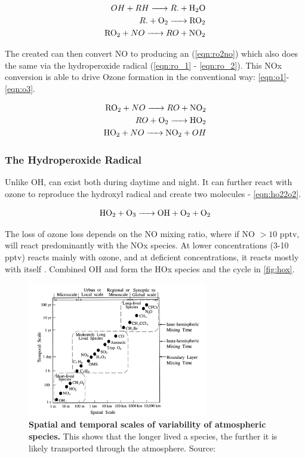 \begin{align}
  OH + RH \ce{ -> } R. + \ch{h2o} \\
  R. + \ch{o2} \ce{ -> } \ch{RO2} \label{eqn:rdo2}\\
  \ch{ro2} + NO \ce{ -> } RO + \ch{no2}
\end{align}


The created  can then convert NO to  producing an  (\autoref{eqn:ro2no}) which also does the same via the hydroperoxide radical  (\autoref{eqn:ro_1} - \ref{eqn:ro_2}). This NOx conversion is able to drive Ozone formation in the conventional way: \autoref{eqn:o1}-\ref{eqn:o3}.


  \begin{align}
    \ch{ro2} + NO \ce{ -> } RO + \ch{no2} \label{eqn:ro2no} \\
    RO + \ce{O2}  \ce{ -> } \ch{HO2} \label{eqn:ro_1} \\
    \ce{HO2} + NO \ce{ -> } \ch{NO2} + OH \label{eqn:ro_2}
\end{align}


\subsubsection{The Hydroperoxide Radical}

Unlike OH,  can exist both during daytime and night. It can further react with ozone to reproduce the hydroxyl radical and create two  molecules - \autoref{eqn:ho22o2}.

\begin{equation}
  \ce{HO2 + O3 -> OH + O2 + O2} \label{eqn:ho22o2}
\end{equation}

The loss of ozone loss depends on the NO mixing ratio, where if NO $>10$ pptv,  will react predominantly with the NOx species. At lower concentrations (3-10 pptv)  reacts mainly with ozone, and at deficient concentrations, it reacts mostly with itself \citep{finlayson}. Combined OH and  form the HOx species and the cycle in \autoref{fig:hox}.

\begin{figure}[H]
  \centering
  \includegraphics[width=0.7\textwidth]{timescales.png}
  \caption{\textbf{Spatial and temporal scales of variability of atmospheric species.} This shows that the longer lived a species, the further it is likely transported through the atmosphere. Source: \citep{transporttime}}
  \label{fig:timescales}
\end{figure}

